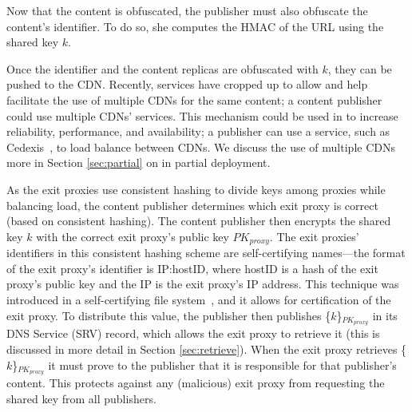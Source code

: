 Now that the content is obfuscated, the publisher must also obfuscate the content's identifier.  To do so, 
she computes the HMAC of the URL using the shared key $k$.

Once the identifier and the content replicas are obfuscated with $k$, they can be pushed to the 
CDN.  Recently, services have cropped up to allow and help facilitate the use of multiple CDNs for the same content; a content 
publisher could use multiple CDNs' services.  This mechanism could be used in \system{} to increase reliability, 
performance, and availability; a publisher can use a service, such as Cedexis~\cite{cedexis}, to load balance between 
CDNs.  We discuss the use of multiple CDNs more in Section \ref{sec:partial} on \system{} in 
partial deployment.  %

As the exit proxies use consistent hashing to divide keys among proxies while balancing load, the content publisher
determines which exit proxy is correct (based on consistent hashing).  The content publisher then encrypts the 
shared key $k$ with the correct exit proxy's public key $PK_{proxy}$.  The exit proxies' identifiers in this consistent 
hashing scheme are self-certifying names---the format of the exit proxy's identifier is IP:hostID, where hostID is a 
hash of the exit proxy's public key and the IP is the exit proxy's IP address.  This technique was introduced 
in a self-certifying file system~\cite{mazieres2000self}, and it allows for certification of the exit proxy. To distribute this value, the publisher 
then publishes \{$k$\}$_{PK_{proxy}}$ in its DNS Service (SRV) record, which allows the exit proxy to retrieve it (this is discussed in more 
detail in Section \ref{sec:retrieve}).  When the exit proxy retrieves \{$k$\}$_{PK_{proxy}}$ it must prove to the publisher that it 
is responsible for that publisher's content.  This protects against any (malicious) exit proxy from requesting the shared key 
from all publishers.


